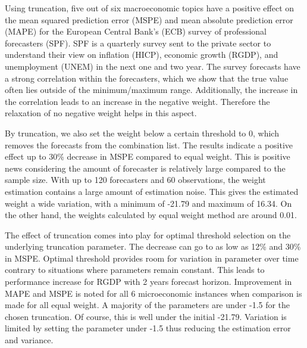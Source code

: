 \documentclass[11pt]{article}
\begin{document}
Using truncation, five out of six macroeconomic topics have a positive effect on the mean squared prediction error (MSPE) and mean absolute prediction error (MAPE) for the European Central Bank's (ECB) survey of professional forecasters (SPF). SPF is a quarterly survey sent to the private sector to understand their view on inflation (HICP), economic growth (RGDP), and unemployment (UNEM) in the next one and two year. The survey forecasts have a strong correlation within the forecasters, which we show that the true value often lies outside of the minimum/maximum range. Additionally, the increase in the correlation leads to an increase in the negative weight. Therefore the relaxation of no negative weight helps in this aspect.

By truncation, we also set the weight below a certain threshold to 0, which removes the forecasts from the combination list. The results indicate a positive effect up to 30\% decrease in MSPE compared to equal weight. 
This is positive news considering the amount of forecaster is relatively large compared to the sample size. 
With up to 120 forecasters and 60 observations, the weight estimation contains a large amount of estimation noise.
This gives the estimated weight a wide variation, with a minimum of -21.79 and maximum of 16.34. On the other hand, the weights calculated by equal weight method are around 0.01.

The effect of truncation comes into play for optimal threshold selection on the underlying truncation parameter. The decrease can go to as low as 12\% and 30\% in MSPE. Optimal threshold provides room for variation in parameter over time contrary to situations where parameters remain constant. This leads to performance increase for RGDP with 2 years forecast horizon. Improvement in MAPE and MSPE is noted for all 6 microeconomic instances when comparison is made for all equal weight. A majority of the parameters are under -1.5 for the chosen truncation. Of course, this is well under the initial -21.79. Variation is limited by setting the parameter under -1.5 thus reducing the estimation error and variance. 
\end{document}
